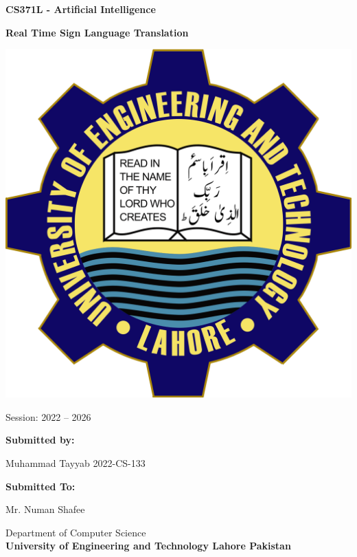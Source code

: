 \documentclass{article}
\begin{document}
\begin{titlepage}
\centering
\vspace{1em}
\fontsize{14}{16}\selectfont %
\textbf{CS371L - Artificial Intelligence}

\vspace{2.5em}

\fontsize{24}{26}\selectfont %
\textbf{Real Time Sign Language Translation}
\vspace{1.5em}



\includegraphics[width=0.3\linewidth]{UET_logo.png} \\
\fontsize{10}{12}\selectfont %
\caption{Session: 2022 – 2026}

\vspace{4em}

\fontsize{16}{18}\selectfont %
\textbf{Submitted by:} \\

\vspace{0.5em}

\fontsize{15}{18}\selectfont %
Muhammad Tayyab      \hspace{1.5em}           2022-CS-133

\vspace{3em}

\fontsize{16}{18}\selectfont %
\textbf{Submitted To:} \\

\vspace{0.5em}

\fontsize{15}{18}\selectfont %
Mr. Numan Shafee

\vspace{4em}

\fontsize{18}{20}\selectfont %
Department of Computer Science \\
\fontsize{22}{25}\selectfont %
\textbf{University of Engineering and Technology Lahore Pakistan}
\end{titlepage}
\end{document}

